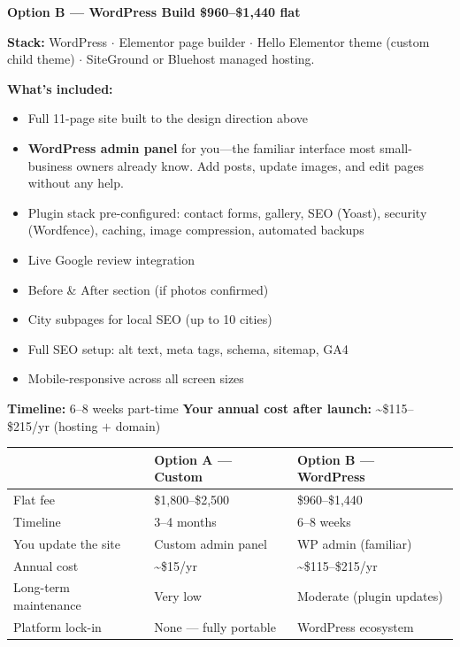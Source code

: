 \documentclass[11pt, letterpaper]{article}
\begin{document}
\begin{mdframed}[
  backgroundcolor=stone,
  linecolor=midgray,
  linewidth=0.6pt,
  innerleftmargin=10pt,
  innerrightmargin=10pt,
  innertopmargin=8pt,
  innerbottommargin=8pt,
  roundcorner=4pt
]
\textbf{\color{darkgray}\large Option B --- WordPress Build \hfill
\normalsize\$960--\$1,440 flat}

\vspace{4pt}
\textbf{Stack:} WordPress $\cdot$ Elementor page builder $\cdot$ Hello
Elementor theme (custom child theme) $\cdot$ SiteGround or Bluehost managed
hosting.

\vspace{4pt}
\textbf{What's included:}
\begin{itemize}
  \item Full 11-page site built to the design direction above
  \item \textbf{WordPress admin panel} for you---the familiar interface most
        small-business owners already know. Add posts, update images, and edit
        pages without any help.
  \item Plugin stack pre-configured: contact forms, gallery, SEO (Yoast),
        security (Wordfence), caching, image compression, automated backups
  \item Live Google review integration
  \item Before \& After section (if photos confirmed)
  \item City subpages for local SEO (up to 10 cities)
  \item Full SEO setup: alt text, meta tags, schema, sitemap, GA4
  \item Mobile-responsive across all screen sizes
\end{itemize}

\vspace{4pt}
\textbf{Timeline:} 6--8 weeks part-time \quad
\textbf{Your annual cost after launch:} \textasciitilde\$115--\$215/yr
(hosting $+$ domain)
\end{mdframed}

\vspace{10pt}

\begin{tabularx}{\linewidth}{lXX}
\toprule
 & \textbf{Option A --- Custom} & \textbf{Option B --- WordPress} \\
\midrule
Flat fee             & \$1,800--\$2,500        & \$960--\$1,440 \\
Timeline             & 3--4 months             & 6--8 weeks \\
You update the site  & Custom admin panel      & WP admin (familiar) \\
Annual cost          & \textasciitilde\$15/yr  & \textasciitilde\$115--\$215/yr \\
Long-term maintenance & Very low               & Moderate (plugin updates) \\
Platform lock-in     & None --- fully portable & WordPress ecosystem \\
\bottomrule
\end{tabularx}
\end{document}

